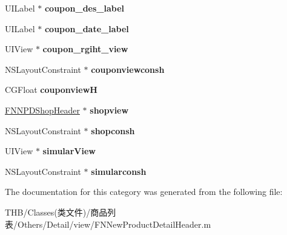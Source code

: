 \begin{DoxyCompactItemize}
\mbox{\label{category_f_n_new_product_detail_header_07_08_afacb36e4a141fe1e51e207973a8de9fc}} 
U\+I\+Label $\ast$ {\bfseries coupon\+\_\+des\+\_\+label}
\item 
\mbox{\label{category_f_n_new_product_detail_header_07_08_a188b3f87048851f8d5302aee67f28382}} 
U\+I\+Label $\ast$ {\bfseries coupon\+\_\+date\+\_\+label}
\item 
\mbox{\label{category_f_n_new_product_detail_header_07_08_a423ac9b7681d761a66b96ac91a8561c1}} 
U\+I\+View $\ast$ {\bfseries coupon\+\_\+rgiht\+\_\+view}
\item 
\mbox{\label{category_f_n_new_product_detail_header_07_08_af298d5a23a4c8b0d37a0c27b6390c61d}} 
N\+S\+Layout\+Constraint $\ast$ {\bfseries couponviewconsh}
\item 
\mbox{\label{category_f_n_new_product_detail_header_07_08_a271f290e1517aa049cf6609a11ba74bf}} 
C\+G\+Float {\bfseries couponviewH}
\item 
\mbox{\label{category_f_n_new_product_detail_header_07_08_aa88c0043998c14cf3121179583a963ca}} 
\mbox{\hyperlink{interface_f_n_n_p_d_shop_header}{F\+N\+N\+P\+D\+Shop\+Header}} $\ast$ {\bfseries shopview}
\item 
\mbox{\label{category_f_n_new_product_detail_header_07_08_afbe6d921bd67a809b697317dae2a8073}} 
N\+S\+Layout\+Constraint $\ast$ {\bfseries shopconsh}
\item 
\mbox{\label{category_f_n_new_product_detail_header_07_08_a5c88f012fe758f2ae75f956709af8e66}} 
U\+I\+View $\ast$ {\bfseries simular\+View}
\item 
\mbox{\label{category_f_n_new_product_detail_header_07_08_a0a7bd207032f4cdceaca868e9388ce7d}} 
N\+S\+Layout\+Constraint $\ast$ {\bfseries simularconsh}
\end{DoxyCompactItemize}


The documentation for this category was generated from the following file\+:\begin{DoxyCompactItemize}
\item 
T\+H\+B/\+Classes(类文件)/商品列表/\+Others/\+Detail/view/F\+N\+New\+Product\+Detail\+Header.\+m\end{DoxyCompactItemize}
